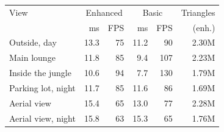 \begin{tabular}{l r r r r r}
\toprule
View & \multicolumn{2}{c}{Enhanced} & \multicolumn{2}{c}{Basic} & Triangles \\
 & ms & FPS & ms & FPS & (enh.) \\
\midrule
Outside, day & 13.3 & 75 & 11.2 & 90 & 2.30M \\
Main lounge & 11.8 & 85 & 9.4 & 107 & 2.23M \\
Inside the jungle & 10.6 & 94 & 7.7 & 130 & 1.79M \\
Parking lot, night & 11.7 & 85 & 11.6 & 86 & 1.69M \\
Aerial view & 15.4 & 65 & 13.0 & 77 & 2.28M \\
Aerial view, night & 15.8 & 63 & 15.3 & 65 & 1.76M \\
\bottomrule
\end{tabular}
